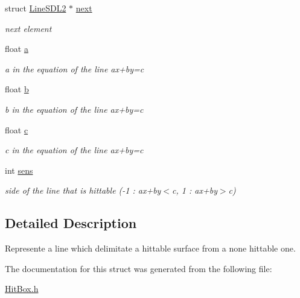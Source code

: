 \begin{DoxyCompactItemize}
\item 
struct \hyperlink{structLineSDL2}{Line\+S\+D\+L2} $\ast$ \hyperlink{structLineSDL2_a97e5c096a263e55935fda7808dd62fc3}{next}\hypertarget{structLineSDL2_a97e5c096a263e55935fda7808dd62fc3}{}\label{structLineSDL2_a97e5c096a263e55935fda7808dd62fc3}

\begin{DoxyCompactList}\small\item\em next element \end{DoxyCompactList}\item 
float \hyperlink{structLineSDL2_acc7ec7d970be00e39766e7bbaf4e6375}{a}\hypertarget{structLineSDL2_acc7ec7d970be00e39766e7bbaf4e6375}{}\label{structLineSDL2_acc7ec7d970be00e39766e7bbaf4e6375}

\begin{DoxyCompactList}\small\item\em a in the equation of the line ax+by=c \end{DoxyCompactList}\item 
float \hyperlink{structLineSDL2_ac5d6441cec617729d6a89ecaa81e84f8}{b}\hypertarget{structLineSDL2_ac5d6441cec617729d6a89ecaa81e84f8}{}\label{structLineSDL2_ac5d6441cec617729d6a89ecaa81e84f8}

\begin{DoxyCompactList}\small\item\em b in the equation of the line ax+by=c \end{DoxyCompactList}\item 
float \hyperlink{structLineSDL2_afe58519a94706033c6dd8bd68c5f66a8}{c}\hypertarget{structLineSDL2_afe58519a94706033c6dd8bd68c5f66a8}{}\label{structLineSDL2_afe58519a94706033c6dd8bd68c5f66a8}

\begin{DoxyCompactList}\small\item\em c in the equation of the line ax+by=c \end{DoxyCompactList}\item 
int \hyperlink{structLineSDL2_af3899a41b666d9aa2281ae1bc833d5e7}{sens}\hypertarget{structLineSDL2_af3899a41b666d9aa2281ae1bc833d5e7}{}\label{structLineSDL2_af3899a41b666d9aa2281ae1bc833d5e7}

\begin{DoxyCompactList}\small\item\em side of the line that is hittable (-\/1 \+: ax+by$<$c, 1 \+: ax+by$>$c) \end{DoxyCompactList}\end{DoxyCompactItemize}


\subsection{Detailed Description}
Represente a line which delimitate a hittable surface from a none hittable one. 

The documentation for this struct was generated from the following file\+:\begin{DoxyCompactItemize}
\item 
\hyperlink{HitBox_8h}{Hit\+Box.\+h}\end{DoxyCompactItemize}
